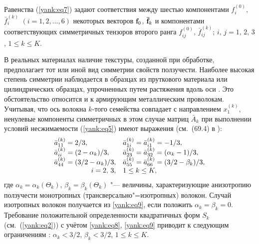 Равенства (\ref{yank:eq7}) задают соответствия между шестью компонентами $f_i^{(0)}$, $\bar {f}_i^{(k)}$ $(i=1, 2, \dots, 6)$
некоторых векторов ${\rm{\bf f}}_0$, ${\rm {\bf \bar {f}}}_k$ и компонентами соответствующих
симметричных тензоров второго ранга $f_{ij}^{(0)}$, $\bar {f}_{ij}^{(k)}$; $i,\,j=1,\,2,\,3$, $1\le k\le K$.

В реальных материалах наличие текстуры, созданной при обработке,
предполагает тот или иной вид симметрии свойств ползучести. Наиболее высокая
степень симметрии наблюдается в образцах из пруткового материала или
цилиндрических образцах, упрочненных путем растяжения вдоль оси \cite{yank:bib3}. Это
обстоятельство относится и к армирующим металлическим проволокам. Учитывая,
что ось волокна $k$-того семейства совпадает с направлением $x_1^{(k)}$,
ненулевые компоненты симметричных в этом случае матриц $\bar {A}_k$ при
выполнении условий несжимаемости (\ref{yank:eq5}) имеют выражения (см.~(69.4) в \cite{yank:bib3}):
\begin{equation}
\label{yank:eq9}
\begin{array}{ll}
\bar {a}_{11}^{(k)} = {2}/{3}, & 
\bar {a}_{1i}^{(k)} =\bar {a}_{i1}^{(k)} =-{1}/{3}, 
\\
\bar {a}_{ii}^{(k)} = ({ 2-\alpha _k})/{3}, & \bar {a}_{23}^{(k)} =\bar{a}_{32}^{(k)} = ({\alpha _k -1})/{3}, 
\\
\bar {a}_{44}^{(k)} = ({3/2-\alpha _k})/{3}, &
\bar {a}_{55}^{(k)} =\bar {a}_{66}^{(k)}=({3/2-\beta _k })/{3}, \\
\hfill i=2,\,3,  & 1\le k\le K,
\end{array}
\end{equation}
где $\alpha _k =\alpha _k (\Theta _k)$, $\beta _k =\beta _k (\Theta _k)$ "--- величины, характеризующие анизотропию
ползучести монотропных (трансверсально"=изотропных) волокон. 
Случай изотропных волокон получается из \eqref{yank:eq9}, если положить $\alpha _k =\beta _k
=0$. Требование положительной определенности квадратичных форм $S_k$ (см.~(\ref{yank:eq2})) с учётом \eqref{yank:eq8}, \eqref{yank:eq9} приводит к следующим ограничениям
\cite{yank:bib3}: $\alpha_k<3/2$, $\beta _k <3/2$, $1\le k\le K$.

